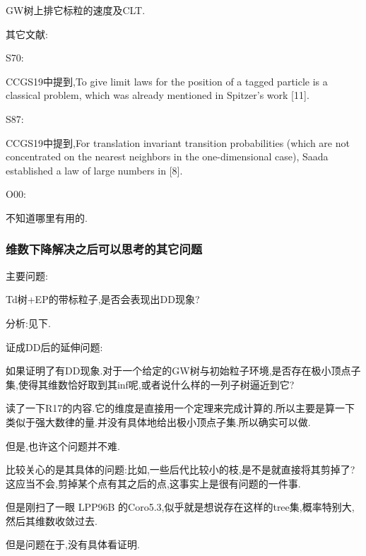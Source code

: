 \documentclass[a4paper,oneside]{ctexbook}
\begin{document}
					GW树上排它标粒的速度及CLT.

				其它文献:

				S70:

					CCGS19中提到,To give limit laws for the position of a tagged particle is a classical problem, which was already mentioned in Spitzer’s work [11].

				S87:

					CCGS19中提到,For translation invariant transition probabilities (which are not concentrated on the nearest neighbors in the one-dimensional case), Saada established a law of large numbers in [8].

				O00:

					不知道哪里有用的.
			
			\subsubsection*{维数下降解决之后可以思考的其它问题}

				主要问题:

					\begin{que}

						Td树+EP的带标粒子,是否会表现出DD现象?
					
					\end{que}

					分析:见下.					

				证成DD后的延伸问题:

					\begin{que}

						如果证明了有DD现象.对于一个给定的GW树与初始粒子环境,是否存在极小顶点子集,使得其维数恰好取到其inf呢,或者说什么样的一列子树逼近到它?
					
					\end{que}

						读了一下R17的内容.它的维度是直接用一个定理来完成计算的.所以主要是算一下类似于强大数律的量.并没有具体地给出极小顶点子集.所以确实可以做.

						但是,也许这个问题并不难.

						比较关心的是其具体的问题:比如,一些后代比较小的枝,是不是就直接将其剪掉了?这应当不会,剪掉某个点有其之后的点,这事实上是很有问题的一件事.

						但是刚扫了一眼 LPP96B 的Coro5.3,似乎就是想说存在这样的tree集,概率特别大,然后其维数收敛过去.

							但是问题在于,没有具体看证明.
\end{document}
